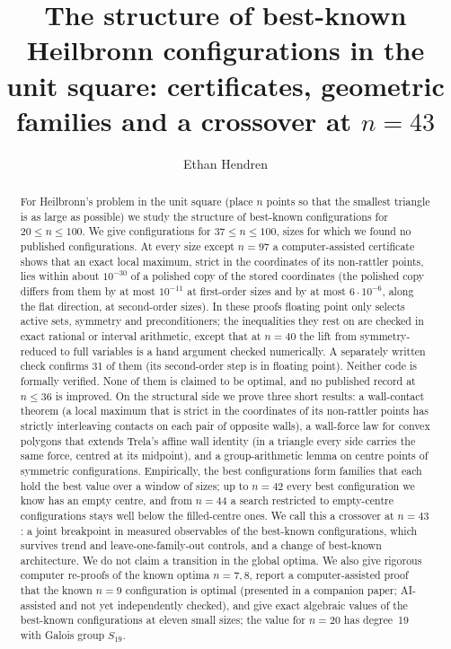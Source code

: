 \documentclass[11pt]{amsart}
\theoremstyle{definition}
\begin{document}
\title[Structure of best-known Heilbronn configurations]{The structure of best-known Heilbronn configurations in the unit square: certificates, geometric families and a crossover at $n=43$}

\author{Ethan Hendren}

\begin{abstract}
For Heilbronn's problem in the unit square (place $n$ points so that the smallest triangle is as large as possible) we study the structure of best-known configurations for $20 \le n \le 100$.
We give configurations for $37 \le n \le 100$, sizes for which we found no published configurations. At every size except $n = 97$ a computer-assisted certificate shows that an exact local maximum, strict in the coordinates of its non-rattler points, lies within about $10^{-30}$ of a polished copy of the stored coordinates (the polished copy differs from them by at most $10^{-11}$ at first-order sizes and by at most $6\cdot10^{-6}$, along the flat direction, at second-order sizes). In these proofs floating point only selects active sets, symmetry and preconditioners; the inequalities they rest on are checked in exact rational or interval arithmetic, except that at $n = 40$ the lift from symmetry-reduced to full variables is a hand argument checked numerically. A separately written check confirms 31 of them (its second-order step is in floating point). Neither code is formally verified.
None of them is claimed to be optimal, and no published record at $n \le 36$ is improved.
On the structural side we prove three short results: a wall-contact theorem (a local maximum that is strict in the coordinates of its non-rattler points has strictly interleaving contacts on each pair of opposite walls), a wall-force law for convex polygons that extends Trela's affine wall identity (in a triangle every side carries the same force, centred at its midpoint), and a group-arithmetic lemma on centre points of symmetric configurations.
Empirically, the best configurations form families that each hold the best value over a window of sizes; up to $n = 42$ every best configuration we know has an empty centre, and from $n = 44$ a search restricted to empty-centre configurations stays well below the filled-centre ones.
We call this a crossover at $n = 43$: a joint breakpoint in measured observables of the best-known configurations, which survives trend and leave-one-family-out controls, and a change of best-known architecture. We do not claim a transition in the global optima.
We also give rigorous computer re-proofs of the known optima $n = 7, 8$, report a computer-assisted proof that the known $n = 9$ configuration is optimal (presented in a companion paper; AI-assisted and not yet independently checked), and give exact algebraic values of the best-known configurations at eleven small sizes; the value for $n = 20$ has degree~19 with Galois group $S_{19}$.
\end{abstract}
\end{document}
